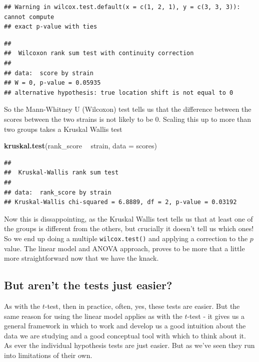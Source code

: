 \documentclass[
]{book}
\newenvironment{Shaded}{\begin{snugshade}}{\end{snugshade}}
\newcommand{\DataTypeTok}[1]{\textcolor[rgb]{0.13,0.29,0.53}{#1}}
\newcommand{\KeywordTok}[1]{\textcolor[rgb]{0.13,0.29,0.53}{\textbf{#1}}}
\newcommand{\NormalTok}[1]{#1}
\newcommand{\OperatorTok}[1]{\textcolor[rgb]{0.81,0.36,0.00}{\textbf{#1}}}
\newcommand{\StringTok}[1]{\textcolor[rgb]{0.31,0.60,0.02}{#1}}
\begin{document}
\begin{verbatim}
## Warning in wilcox.test.default(x = c(1, 2, 1), y = c(3, 3, 3)): cannot compute
## exact p-value with ties
\end{verbatim}

\begin{verbatim}
## 
## 	Wilcoxon rank sum test with continuity correction
## 
## data:  score by strain
## W = 0, p-value = 0.05935
## alternative hypothesis: true location shift is not equal to 0
\end{verbatim}

So the Mann-Whitney U (Wilcoxon) test tells us that the difference between the scores between the two strains is not likely to be 0. Scaling this up to more than two groups takes a Kruskal Wallis test

\begin{Shaded}
\begin{Highlighting}[]
\KeywordTok{kruskal.test}\NormalTok{(rank_score }\OperatorTok{~}\StringTok{ }\NormalTok{strain, }\DataTypeTok{data =}\NormalTok{ scores)}
\end{Highlighting}
\end{Shaded}

\begin{verbatim}
## 
## 	Kruskal-Wallis rank sum test
## 
## data:  rank_score by strain
## Kruskal-Wallis chi-squared = 6.8889, df = 2, p-value = 0.03192
\end{verbatim}

Now this is dissappointing, as the Kruskal Wallis test tells us that at least one of the groups is different from the others, but crucially it doesn't tell us which ones! So we end up doing a multiple \texttt{wilcox.test()} and applying a correction to the \(p\)value. The linear model and ANOVA approach, proves to be more that a little more straightforward now that we have the knack.

\hypertarget{but-arent-the-tests-just-easier}{%
\subsection{But aren't the tests just easier?}\label{but-arent-the-tests-just-easier}}

As with the \(t\)-test, then in practice, often, yes, these tests are easier. But the same reason for using the linear model applies as with the \(t\)-test - it gives us a general framework in which to work and develop us a good intuition about the data we are studying and a good conceptual tool with which to think about it. As ever the individual hypothesis tests are just easier. But as we've seen they run into limitations of their own.
\end{document}
